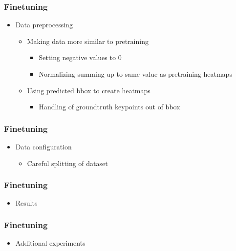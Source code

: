 \documentclass{beamer}
\begin{document}
\begin{frame}
    \frametitle{Finetuning}
    \begin{itemize}
        \item<1-> Data preprocessing
        \begin{itemize}
            \item<1-> Making data more similar to pretraining
            \begin{itemize}
                \item Setting negative values to $0$
                \item Normalizing summing up to same value as pretraining heatmaps
            \end{itemize}
            \item<2-> Using predicted bbox to create heatmaps
            \begin{itemize}
                \item<3-> Handling of groundtruth keypoints out of bbox  
            \end{itemize}
        \end{itemize}
    \end{itemize}
\end{frame}

\begin{frame}
    \frametitle{Finetuning}
    \begin{itemize}
        \item<1-> Data configuration
        \begin{itemize}
            \item Careful splitting of dataset
        \end{itemize}
    \end{itemize}
\end{frame}

\begin{frame}
    \frametitle{Finetuning}
    \begin{itemize}
        \item<1-> Results
    \end{itemize}
\end{frame}

\begin{frame}
    \frametitle{Finetuning}
    \begin{itemize}
        \item<1-> Additional experiments
    \end{itemize}
\end{frame}
\end{document}
